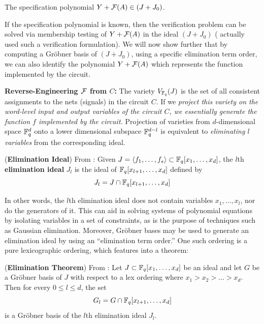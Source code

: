 \begin{Proposition} 
\label{prop:spec_in_IV}
The specification polynomial $Y + {\mathcal{F}}(A) \in
  (J+J_0)$. 
\end{Proposition}

If the specification polynomial is known, then the verification
problem can be solved via membership testing of $Y + {\mathcal{F}}(A)$ in the
ideal $(J + J_0)$ (\cite{lv:date2012} actually used such a verification
formulation). We will now show further that by computing a Gr\"obner
basis of $(J + J_0)$, using a specific elimination term order, we can
also identify the polynomial $Y + {\mathcal{F}}(A)$ which represents the function
implemented by the circuit. 


{\bf Reverse-Engineering ${\mathcal{F}}$ from $C$:} The variety $V_{{\mathbb{F}}_{q}}(J)$ is
the set of all consistent assignments to the nets (signals) in the
circuit $C$. If we {\it project this variety on the word-level input and
output variables of the circuit $C$, we essentially generate the
function $f$ implemented by the circuit.} Projection of varieties from
$d$-dimensional space ${\mathbb{F}}_{q}^d$ onto a lower dimensional subspace
${\mathbb{F}}_{q}^{d-l}$ is equivalent to {\it eliminating $l$ variables} from the
corresponding ideal. 

\begin{Definition}
    ({\bf Elimination Ideal}) From \cite{ideals:book}:  Given
  $J=\langle f_1,\dots,f_s\rangle \subset {\mathbb{F}}_{q}[x_1,\dots,x_d]$, the
  $l$th {\bf elimination ideal} $J_l$ is the ideal of
  ${\mathbb{F}}_{q}[x_{l+1},\dots,x_d]$ defined by 
    \begin{equation}
        J_l= J \cap {\mathbb{F}}_{q}[x_{l+1},\dots,x_d]
    \end{equation}
\end{Definition}

In other words, the $l$th elimination ideal does not contain variables
$x_1,\dots,x_l$, nor do the generators of it.  This can aid in solving
systems of polynomial equations by isolating variables in a set of
constraints, as is the purpose of techniques such as Gaussian
elimination. 
Moreover, Gr\"obner bases may be used to generate an elimination ideal
by using an ``elimination term order.''  One such ordering
is a pure lexicographic ordering, which features into a theorem:
\begin{Theorem} \label{thm:elim}
({\bf Elimination Theorem}) From \cite{ideals:book}: Let $J
  \subset {\mathbb{F}}_{q}[x_1,\dots,x_d]$ be an     ideal and let $G$ be a
  Gr\"obner basis of $J$ with respect to a lex ordering where $x_1
  > x_2 > \dots > x_d$.  Then for every $0     \leq l \leq
  d$, the set 
    \begin{equation}
        G_l= G \cap {\mathbb{F}}_{q}[x_{l+1},\dots,x_d]
    \end{equation}
    is a Gr\"obner basis of the $l$th elimination ideal $J_l$.
\end{Theorem}


